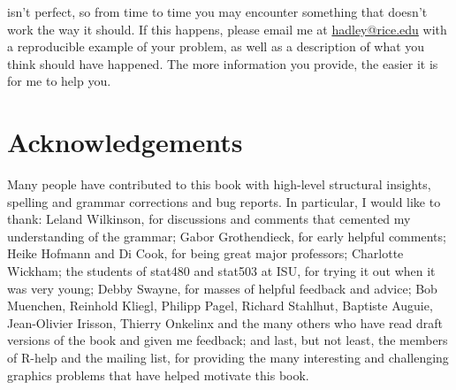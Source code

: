 \ggplot isn't perfect, so from time to time you may encounter something that doesn't work the way it should.  If this happens, please email me at \href{mailto:hadley@rice.edu}{hadley@rice.edu} with a reproducible example of your problem, as well as a description of what you think should have happened.  The more information you provide, the easier it is for me to help you.

\section{Acknowledgements}\label{sec:acknolwedgements}

Many people have contributed to this book with high-level structural insights, spelling and grammar corrections and bug reports.  In particular, I would like to thank: Leland Wilkinson, for discussions and comments that cemented my understanding of the grammar; Gabor Grothendieck, for early helpful comments; Heike Hofmann and Di Cook, for being great major professors; Charlotte Wickham; the students of stat480 and stat503 at ISU, for trying it out when it was very young; Debby Swayne, for masses of helpful feedback and advice; Bob Muenchen, Reinhold Kliegl, Philipp Pagel, Richard Stahlhut, Baptiste Auguie, Jean-Olivier Irisson, Thierry Onkelinx and the many others who have read draft versions of the book and given me feedback; and last, but not least, the members of R-help and the \ggplot mailing list, for providing the many interesting and challenging graphics problems that have helped motivate this book.


